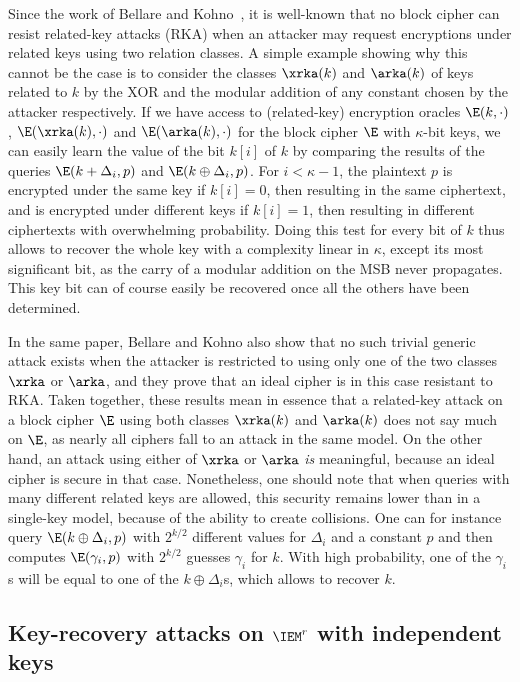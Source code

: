 Since the work of Bellare and Kohno~\cite{BK03}, it is well-known that no block cipher can resist
related-key attacks (RKA) when an attacker may request encryptions under related keys
using two relation classes. A simple example showing why this cannot be the case
is to consider the classes $\xrka(k)$ and $\arka(k)$ of keys
related to $k$ by the XOR and the modular addition of any constant chosen by the attacker respectively.
If we have access to (related-key) encryption oracles
$\E(k,\cdot)$, $\E(\xrka(k),\cdot)$ and $\E(\arka(k),\cdot)$ for the block cipher $\E$ with $\kappa$-bit keys,
we can easily learn the value of the bit $k[i]$ of $k$ by comparing the results of the queries
$\E(k + \Delta_i, p)$
and $\E(k \oplus \Delta_i, p)$. For $i < \kappa - 1$, the plaintext
$p$ is encrypted under the same key if
$k[i] = 0$, then resulting in the same ciphertext, and is
encrypted under different keys if $k[i] = 1$, then resulting in different ciphertexts
with overwhelming probability.
Doing this test for every bit of $k$ thus allows to recover the whole key
with a complexity linear in $\kappa$, except its most significant bit, as
the carry of a modular addition on the MSB never propagates.%
This key bit can of course easily be recovered once all the others have been determined.

In the same paper, Bellare and Kohno also show that no such trivial generic attack exists when
the attacker is restricted to using
only one of the two classes $\xrka$ or $\arka$, and they prove that an ideal
cipher is in this case resistant to RKA. Taken together, these results mean in essence
that a related-key attack on a block cipher $\E$ using both classes $\xrka(k)$ and $\arka(k)$ does not say
much on $\E$, as nearly all ciphers fall to an attack
in the same model. On the other hand, an attack using either of $\xrka$ or $\arka$ \emph{is} meaningful,
because an ideal cipher is secure in that case.
Nonetheless, one should note that when
queries with many different related keys are allowed, this security remains lower than in a single-key model,
because of the ability to create collisions. One can
for instance query $\E(k\oplus\Delta_i,p)$ with $2^{k/2}$ different values for $\Delta_i$ and a constant $p$
and then computes $\E(\gamma_i,p)$ with $2^{k/2}$ guesses $\gamma_i$ for $k$. With high probability, one
of the $\gamma_i$s will be equal to one of the $k\oplus\Delta_i$s, which allows to recover $k$.

\subsection{Key-recovery attacks on $\IEM^r$ with independent keys}

